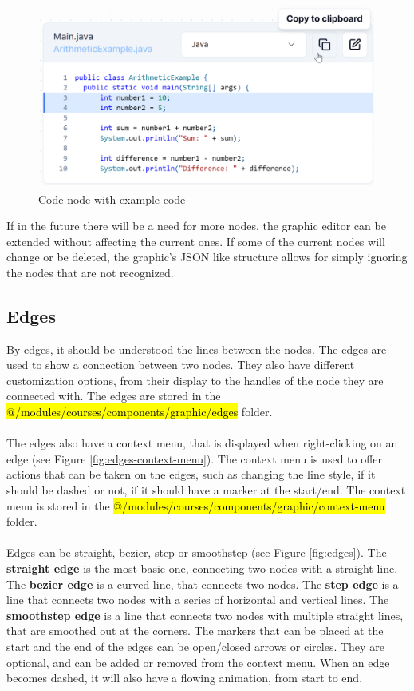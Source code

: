 \begin{figure}[hbt!]
    \centering
    \includegraphics[scale=0.65]{images/code-node.png}
    \caption{Code node with example code}
    \label{fig:code-node}
\end{figure}
\newpage
\noindent If in the future there will be a need for more nodes, the graphic editor can be extended without affecting the current ones. If some of the current nodes will change or be deleted, the graphic's JSON like structure allows for simply ignoring the nodes that are not recognized.

\subsection{Edges}

\noindent By edges, it should be understood the lines between the nodes. The edges are used to show a connection between two nodes. They also have different customization options, from their display to the handles of the node they are connected with. The edges are stored in the \hl{@/modules/courses/components/graphic/edges} folder.
\\\\
\noindent The edges also have a context menu, that is displayed when right-clicking on an edge (see Figure \ref{fig:edges-context-menu}). The context menu is used to offer actions that can be taken on the edges, such as changing the line style, if it should be dashed or not, if it should have a marker at the start/end. The context menu is stored in the \hl{@/modules/courses/components/graphic/context-menu} folder.
\\\\
\noindent Edges can be straight, bezier, step or smoothstep (see Figure \ref{fig:edges}). The \textbf{straight edge} is the most basic one, connecting two nodes with a straight line. The \textbf{bezier edge} is a curved line, that connects two nodes. The \textbf{step edge} is a line that connects two nodes with a series of horizontal and vertical lines. The \textbf{smoothstep edge} is a line that connects two nodes with multiple straight lines, that are smoothed out at the corners. The markers that can be placed at the start and the end of the edges can be open/closed arrows or circles. They are optional, and can be added or removed from the context menu. When an edge becomes dashed, it will also have a flowing animation, from start to end.

